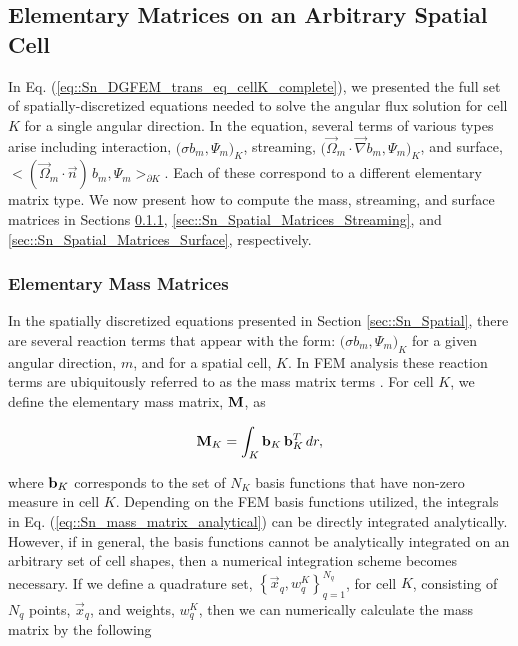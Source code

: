 \subsection{Elementary Matrices on an Arbitrary Spatial Cell}
\label{sec::Sn_Spatial_Matrices}

In Eq. (\ref{eq::Sn_DGFEM_trans_eq_cellK_complete}), we presented the full set of spatially-discretized equations needed to solve the angular flux solution for cell $K$ for a single angular direction. In the equation, several terms of various types arise including interaction, $\Big( \sigma  b_m , \Psi_m  \Big)_K$, streaming, $ \Big( \vec{\Omega}_m \cdot \vec{\nabla}  b_m , \Psi_m  \Big)_K$, and surface, $     \Big< \left( \vec{\Omega}_m \cdot  \vec{n} \right) \, b_m, \Psi_m  \Big>_{\partial K}$. Each of these correspond to a different elementary matrix type. We now present how to compute the mass, streaming, and surface matrices in Sections \ref{sec::Sn_Spatial_Matrices_Mass}, \ref{sec::Sn_Spatial_Matrices_Streaming}, and \ref{sec::Sn_Spatial_Matrices_Surface}, respectively.

\subsubsection{Elementary Mass Matrices}
\label{sec::Sn_Spatial_Matrices_Mass}

In the spatially discretized equations presented in Section \ref{sec::Sn_Spatial}, there are several reaction terms that appear with the form: $\Big( \sigma  b_m , \Psi_m  \Big)_K$ for a given angular direction, $m$, and for a spatial cell, $K$. In FEM analysis these reaction terms are ubiquitously referred to as the mass matrix terms \cite{zeinkiewicz2005finite,akin1982application}. For cell $K$, we define the elementary mass matrix, ${\bf M}$, as

\begin{equation}
\label{eq::Sn_mass_matrix_analytical}
{\bf M}_K =    \int_K {\bf b}_K \, {\bf b}_K^T \, d r ,
\end{equation}

\noindent where ${\bf b}_K$ corresponds to the set of $N_K$ basis functions that have non-zero measure in cell $K$. Depending on the FEM basis functions utilized, the integrals in Eq. (\ref{eq::Sn_mass_matrix_analytical}) can be directly integrated analytically. However, if in general, the basis functions cannot be analytically integrated on an arbitrary set of cell shapes, then a numerical integration scheme becomes necessary. If we define a quadrature set, $\left\{  \vec{x}_q , w_q^{K}  \right\}_{q=1}^{N_q}$, for cell $K$, consisting of $N_q$ points, $\vec{x}_q$, and weights, $w_q^K$, then we can numerically calculate the mass matrix by the following


